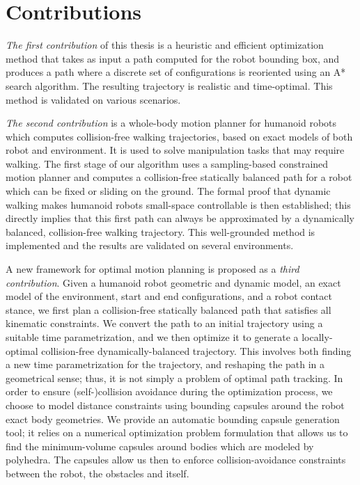 \section{Contributions}

\emph{The first contribution} of this thesis is a heuristic and
efficient optimization method that takes as input a path computed for
the robot bounding box, and produces a path where a discrete set of
configurations is reoriented using an A* search algorithm. The
resulting trajectory is realistic and time-optimal. This method is
validated on various scenarios.

\emph{The second contribution} is a whole-body motion planner for
humanoid robots which computes collision-free walking trajectories,
based on exact models of both robot and environment. It is used to
solve manipulation tasks that may require walking. The first stage of
our algorithm uses a sampling-based constrained motion planner and
computes a collision-free statically balanced path for a robot which
can be fixed or sliding on the ground. The formal proof that dynamic
walking makes humanoid robots small-space controllable is then
established; this directly implies that this first path can always be
approximated by a dynamically balanced, collision-free walking
trajectory. This well-grounded method is implemented and the results
are validated on several environments.

A new framework for optimal motion planning is proposed as a
\emph{third contribution}. Given a humanoid robot geometric and
dynamic model, an exact model of the environment, start and end
configurations, and a robot contact stance, we first plan a
collision-free statically balanced path that satisfies all kinematic
constraints. We convert the path to an initial trajectory using a
suitable time parametrization, and we then optimize it to generate a
locally-optimal collision-free dynamically-balanced trajectory. This
involves both finding a new time parametrization for the trajectory,
and reshaping the path in a geometrical sense; thus, it is not simply
a problem of optimal path tracking. In order to ensure
(self-)collision avoidance during the optimization process, we choose
to model distance constraints using bounding capsules around the robot
exact body geometries. We provide an automatic bounding capsule
generation tool; it relies on a numerical optimization problem
formulation that allows us to find the minimum-volume capsules around
bodies which are modeled by polyhedra. The capsules allow us then to
enforce collision-avoidance constraints between the robot, the
obstacles and itself.

